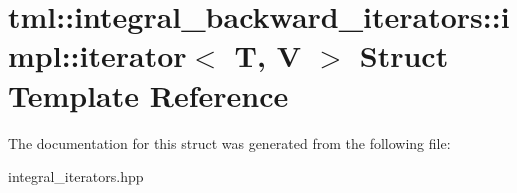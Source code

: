 \hypertarget{structtml_1_1integral__backward__iterators_1_1impl_1_1iterator}{\section{tml\+:\+:integral\+\_\+backward\+\_\+iterators\+:\+:impl\+:\+:iterator$<$ T, V $>$ Struct Template Reference}
\label{structtml_1_1integral__backward__iterators_1_1impl_1_1iterator}
}


The documentation for this struct was generated from the following file\+:\begin{DoxyCompactItemize}
\item 
integral\+\_\+iterators.\+hpp\end{DoxyCompactItemize}
